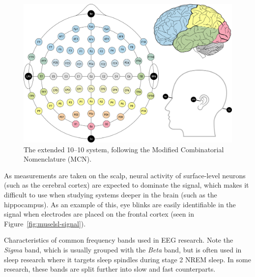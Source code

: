     \begin{landscape}
        \begin{figure}
            \begin{center}
                \includegraphics[width=20cm]{img/1020system-extended-with-extra-info.png}
            \end{center}
            \caption{The extended 10–10 system, following the Modified Combinatorial Nomenclature (MCN).}\label{fig:1010}
        \end{figure}
    \end{landscape}

    As measurements are taken on the scalp, neural activity of surface-level neurons (such as the cerebral cortex) are expected to dominate the signal, which makes it difficult to use when studying systems deeper in the brain (such as the hippocampus). As an example of this, eye blinks are easily identifiable in the signal when electrodes are placed on the frontal cortex (seen in Figure~\ref{fig:muselsl-signal}).

    \begin{table}
        \centering
        
        \caption{Characteristics of common frequency bands used in EEG research. Note the \emph{Sigma} band, which is usually grouped with the \emph{Beta} band, but is often used in sleep research where it targets sleep spindles during stage 2 NREM sleep. In some research, these bands are split further into slow and fast counterparts.}\label{table:freq-bands}
    \end{table}

